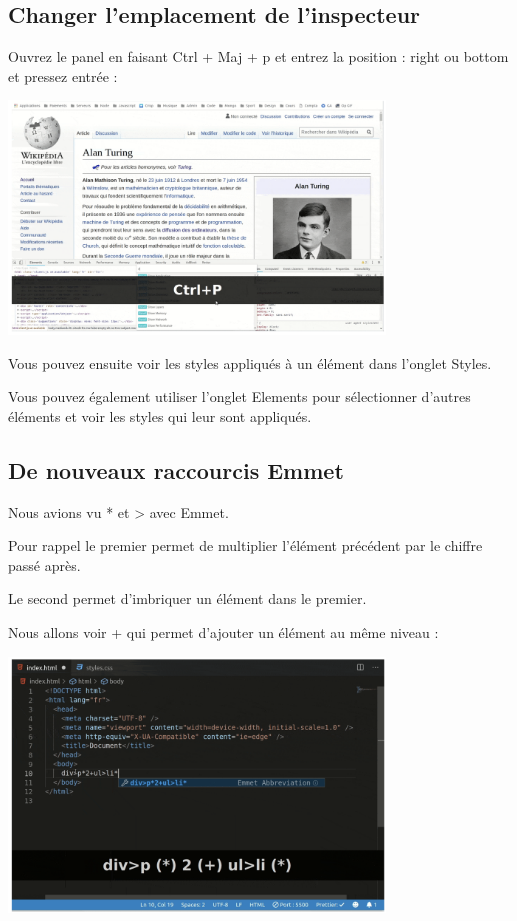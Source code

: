 \documentclass[a4paper]{article}
\begin{document}
\subsection{Changer l'emplacement de l'inspecteur}
Ouvrez le panel en faisant Ctrl + Maj + p et entrez la position : right ou bottom et pressez entrée :
\begin{center}
\includegraphics[width=10cm]{images/image10.png}
\end{center}

Vous pouvez ensuite voir les styles appliqués à un élément dans l'onglet Styles.

Vous pouvez également utiliser l'onglet Elements pour sélectionner d'autres éléments et voir les styles qui leur sont appliqués.

\subsection{De nouveaux raccourcis Emmet}
Nous avions vu * et > avec Emmet.

Pour rappel le premier permet de multiplier l'élément précédent par le chiffre passé après.

Le second permet d'imbriquer un élément dans le premier.

Nous allons voir + qui permet d'ajouter un élément au même niveau :

\begin{center}
\includegraphics[width=10cm]{images/image11.png}
\end{center}
\end{document}
